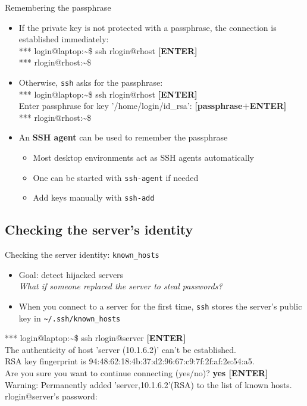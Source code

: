 \documentclass[11pt,final,usepdftitle=false]{beamer}
\newcommand{\tilda}{\textasciitilde{}}
\begin{document}
\begin{frame}{Remembering the passphrase}
\begin{itemize}
\item If the private key is not protected with a passphrase, the connection is established immediately:\\ \hbr
{\ttfamily\footnotesize 
*** login@laptop:\tilda\$  ssh rlogin@rhost \textbf{ [ENTER]}\\
*** rlogin@rhost:\tilda\$\\ }
\hbr
\item Otherwise, \texttt{ssh} asks for the passphrase:\\ \hbr
{\ttfamily\footnotesize 
*** login@laptop:\tilda\$ ssh rlogin@rhost \textbf{ [ENTER]}\\
Enter passphrase for key '/home/login/id\_rsa':  \textbf{[passphrase+ENTER]}\\ 
*** rlogin@rhost:\tilda\$\\ }
\hbr
\item An \textbf{SSH agent} can be used to remember the passphrase
\begin{itemize}
	\item Most desktop environments act as SSH agents automatically
	\item One can be started with \texttt{ssh-agent} if needed
	\item Add keys manually with \texttt{ssh-add}
\end{itemize}
\end{itemize}
\end{frame}

\subsection{Checking the server's identity}

\begin{frame}{Checking the server identity: \texttt{known\_hosts}}
\begin{itemize}
\item Goal: detect hijacked servers\\
\textsl{What if someone replaced the server to steal passwords?}
\hbr
\item When you connect to a server for the first time, \texttt{ssh} stores the server's public key in
	\texttt{\tilda/.ssh/known\_hosts}
\end{itemize}
{\ttfamily\small
*** login@laptop:\tilda\$ ssh rlogin@server\textbf{ [ENTER]}\\ 
The authenticity of host 'server (10.1.6.2)' can't be established.\\
RSA key fingerprint is 94:48:62:18:4b:37:d2:96:67:c9:7f:2f:af:2e:54:a5.\\
Are you sure you want to continue connecting (yes/no)? \textbf{yes [ENTER]}\\ 
Warning: Permanently added 'server,10.1.6.2'(RSA) to the list of known hosts.\\
rlogin@server's password:\\ }
\end{frame}
\end{document}
